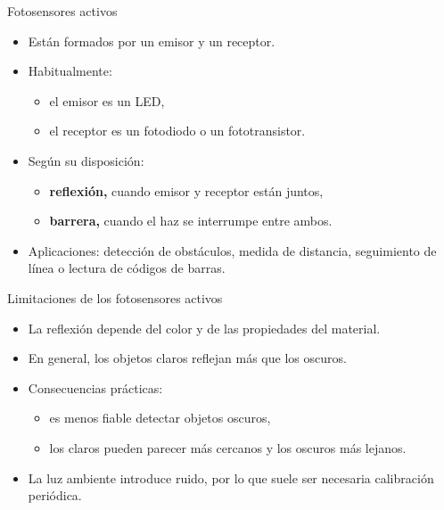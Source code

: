 \documentclass[aspectratio=169]{beamer}
\begin{document}
\begin{frame}{Fotosensores activos}
\small
\begin{itemize}
  \item Están formados por un emisor y un receptor.
  \item Habitualmente:
  \begin{itemize}
    \item el emisor es un LED,
    \item el receptor es un fotodiodo o un fototransistor.
  \end{itemize}
  \item Según su disposición:
  \begin{itemize}
    \item \textbf{reflexión,} cuando emisor y receptor están juntos,
    \item \textbf{barrera,} cuando el haz se interrumpe entre ambos.
  \end{itemize}
  \item Aplicaciones: detección de obstáculos, medida de distancia, seguimiento de línea o lectura de códigos de barras.
\end{itemize}
\end{frame}

\begin{frame}{Limitaciones de los fotosensores activos}
\small
\begin{itemize}
  \item La reflexión depende del color y de las propiedades del material.
  \item En general, los objetos claros reflejan más que los oscuros.
  \item Consecuencias prácticas:
  \begin{itemize}
    \item es menos fiable detectar objetos oscuros,
    \item los claros pueden parecer más cercanos y los oscuros más lejanos.
  \end{itemize}
  \item La luz ambiente introduce ruido, por lo que suele ser necesaria calibración periódica.
\end{itemize}
\end{frame}
\end{document}
